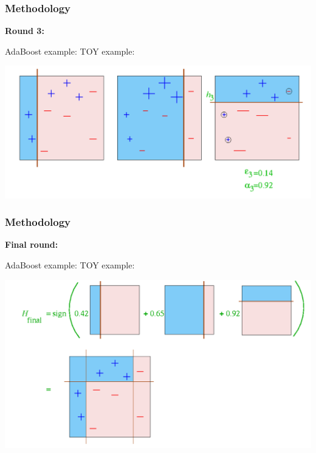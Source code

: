 \documentclass[xcolor={x11names,svgnames,dvipsnames}]{beamer}
\begin{document}
\begin{frame}
	\frametitle{Methodology}
			\small{\textbf{Round 3:}}\\
			
	\begin{block}{AdaBoost example: TOY example:}

      \includegraphics[width=1\textwidth, height=0.6\textheight]{round_3.png}
	\end{block}	
\end{frame}


\begin{frame}
	\frametitle{Methodology}
			\small{\textbf{Final round:}}\\
			
	\begin{block}{AdaBoost example: TOY example:}

      \includegraphics[width=1\textwidth, height=0.6\textheight]{round_4.png}
	\end{block}	
\end{frame}
\end{document}
